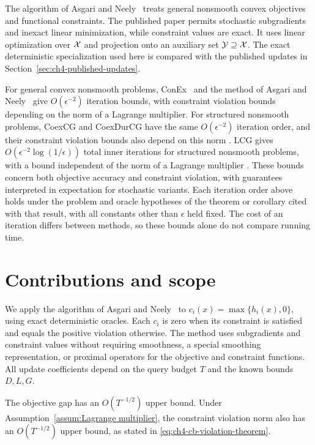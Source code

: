 The algorithm of Asgari and Neely~\cite{asgari2024nonsmooth} treats general
nonsmooth convex objectives and functional constraints. The published
paper permits stochastic subgradients and inexact linear minimization,
while constraint values are exact. It uses linear optimization over
$\mathcal{X}$ and projection onto an auxiliary set $\mathcal{Y}\supseteq\mathcal{X}$.
The exact deterministic specialization used here is compared with the
published updates in Section~\ref{sec:ch4-published-updates}.

For general convex nonsmooth problems,
ConEx~\cite[Theorem~2.3]{BoobDengLan2023ConEx} and the method of
Asgari and Neely~\cite[Theorems~1--2]{asgari2024nonsmooth} give
$O(\epsilon^{-2})$ iteration bounds, with constraint violation bounds depending
on the norm of a Lagrange multiplier. For structured nonsmooth problems,
CoexCG and CoexDurCG have the same $O(\epsilon^{-2})$ iteration order,
and their constraint violation bounds also depend on this norm
\cite[Corollaries~2.7 and~3.7]{lan2021conditional}.
LCG gives $O(\epsilon^{-2}\log(1/\epsilon))$ total inner iterations
for structured nonsmooth problems, with a bound independent of the
norm of a Lagrange multiplier
\cite[Theorem~2.4]{cheng2026functional}.
These bounds concern both objective accuracy and constraint violation, with
guarantees interpreted in expectation for stochastic variants.
Each iteration order above holds under the problem and oracle hypotheses
of the theorem or corollary cited with that result, with all constants
other than $\epsilon$ held fixed.
The cost of an iteration differs between methods, so these bounds alone
do not compare running time.

\section{Contributions and scope}

We apply the algorithm of Asgari and Neely~\cite{asgari2024nonsmooth}
to $c_i(x)=\max\{h_i(x),0\}$, using exact deterministic oracles. Each $c_i$
is zero when its constraint is satisfied and equals the positive violation
otherwise.
The method uses subgradients and constraint values without requiring
smoothness, a special smoothing
representation, or proximal operators for the objective and constraint
functions. All update coefficients depend on the query budget $T$
and the known bounds $D,L,G$.

The objective gap has an $O(T^{-1/2})$ upper bound. Under
Assumption~\ref{assum:Lagrange multiplier}, the constraint violation norm
also has an $O(T^{-1/2})$ upper bound, as stated in
\eqref{eq:ch4-cb-violation-theorem}.

